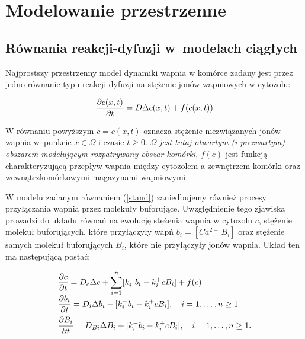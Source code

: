 \chapter{Modelowanie przestrzenne}
\label{chap:modelowaniePrzestrzenne}
\section{Równania reakcji-dyfuzji w~modelach ciągłych} 
Najprostszy przestrzenny model dynamiki wapnia w komórce zadany jest przez jedno równanie typu reakcji-dyfuzji na stężenie jonów wapniowych 
w cytozolu: 

\begin{equation} \label{stand} \dfrac{\partial c(x,t)}{\partial t} = D \Delta c(x,t) + f(c(x,t))
\end{equation} 

\noindent W równaniu powyższym $c=c(x,t)$ oznacza stężenie niezwiązanych jonów wapnia w~punkcie $x \in \Omega$ i czasie $t \geq 0$. $\Omega$ \textit{jest tutaj otwartym (i prezwartym) obszarem modelującym rozpatrywany obszar komórki}, $f(c)$ jest funkcją charakteryzującą przepływ wapnia między cytozolem a zewnętrzem komórki oraz wewnątrzkomórkowymi magazynami wapniowymi. 

\medskip


W modelu zadanym równaniem (\ref{stand}) zaniedbujemy również procesy przyłączania wapnia przez molekuły buforujące. Uwzględnienie tego zjawiska prowadzi do układu równań na ewolucję stężenia wapnia w cytozolu $c$, 
stężenie molekuł buforujących, które przyłączyły wapń $b_i = [Ca^{2+}\,B_i]$ oraz 
stężenie samych molekuł buforujących $B_i$, które nie przyłączyły jonów wapnia. 
Układ ten ma następującą postać: 


\begin{equation} \label{b1p}
\begin{array}{l}
	{\displaystyle
		\frac{\partial c}{\partial t} = D_c \Delta c +
		\sum_{i=1}^n [ k^{-}_i b_i - k^{+}_i c B_i] + f(c)
	}\\[2ex]
	{\displaystyle
		\frac{\partial{b}_i}{\partial t} = D_i \Delta b_i
		- [k^{-}_i b_i - k^{+}_i c B_i], \quad i=1,\ldots,n \geq 1 
	}\\[2ex]
	{\displaystyle
		\frac{\partial{B}_i}{\partial t} = D_{Bi} \Delta B_i
		+ [k^{-}_i b_i - k^{+}_i c B_i], \quad i=1,\ldots,n \geq 1.
	}
\end{array}
\end{equation}

